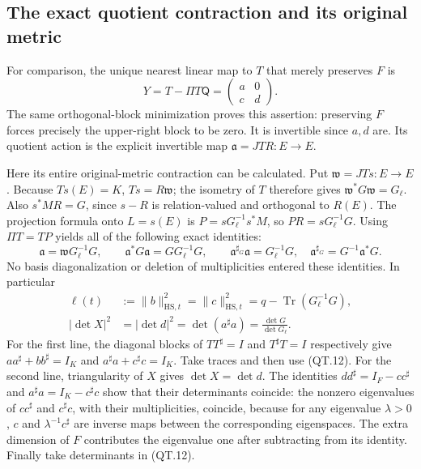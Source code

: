 \subsection{The exact quotient contraction and its original metric}

For comparison, the unique nearest linear map to \(T\) that merely
preserves \(F\) is
\[
 Y=T-\Pi T\mathsf Q
  =\begin{pmatrix}a&0\\c&d\end{pmatrix}.
 \tag{QT.11}\label{eq:qt-descent}
\]
The same orthogonal-block minimization proves this assertion:
preserving \(F\) forces precisely the upper-right block to be zero.
It is invertible since \(a,d\) are. Its quotient action is the
explicit invertible map
\(\mathfrak a=JTR:E\to E\).

Here its entire original-metric contraction can be calculated.
Put \(\mathfrak w=JTs:E\to E\).
Because \(Ts(E)=K\), \(Ts=R\mathfrak w\); the isometry of \(T\)
therefore gives \(\mathfrak w^*G\mathfrak w=G_\ell\).
Also \(s^*MR=G\), since \(s-R\) is relation-valued and orthogonal
to \(R(E)\). The projection formula onto \(L=s(E)\) is
\(P=sG_\ell^{-1}s^*M\), so \(PR=sG_\ell^{-1}G\).
Using \(\Pi T=TP\) yields all of the following exact identities:
\[
 \mathfrak a=\mathfrak wG_\ell^{-1}G,\qquad
 \mathfrak a^*G\mathfrak a=GG_\ell^{-1}G,\qquad
 \mathfrak a^{\sharp_G}\mathfrak a=G_\ell^{-1}G,
 \quad \mathfrak a^{\sharp_G}=G^{-1}\mathfrak a^*G.
 \tag{QT.12}\label{eq:qt-quotientmetric}
\]
No basis diagonalization or deletion of multiplicities entered these
identities. In particular
\[
 \begin{split}
 \ell(t)&:=\|b\|_{\mathrm{HS},t}^2
       =\|c\|_{\mathrm{HS},t}^2
       =q-\operatorname{Tr}(G_\ell^{-1}G),\\
 |\det X|^2&=|\det d|^2
       =\det(a^\sharp a)
       =\frac{\det G}{\det G_\ell}.
 \end{split}
 \tag{QT.13}\label{eq:qt-leakagedet}
\]
For the first line, the diagonal blocks of \(TT^\sharp=I\) and
\(T^\sharp T=I\) respectively give
\(aa^\sharp+bb^\sharp=I_K\) and
\(a^\sharp a+c^\sharp c=I_K\). Take traces and then use (QT.12).
For the second line, triangularity of \(X\) gives \(\det X=\det d\).
The identities
\(dd^\sharp=I_F-cc^\sharp\) and
\(a^\sharp a=I_K-c^\sharp c\) show that their determinants coincide:
the nonzero eigenvalues of \(cc^\sharp\) and \(c^\sharp c\),
with their multiplicities, coincide, because for any eigenvalue
\(\lambda>0\), \(c\) and \(\lambda^{-1}c^\sharp\) are inverse
maps between the corresponding eigenspaces. The extra dimension
of \(F\) contributes the eigenvalue one after subtracting from its
identity. Finally take determinants in (QT.12).

